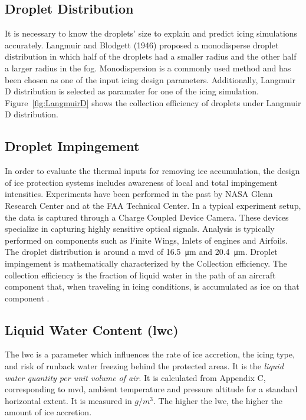 \documentclass[english]{kththesis}
\begin{document}
\subsection{Droplet Distribution}
\label{subsec:medvoldia}
It is necessary to know the droplets' size to explain and predict icing simulations accurately. Langmuir and Blodgett (1946) proposed a monodisperse droplet distribution in which half of the droplets had a smaller radius and the other half a larger radius in the fog. Monodispersion is a commonly used method and has been chosen as one of the input icing design parameters. Additionally,  Langmuir D distribution is selected as paramater for one of the icing simulation. Figure~\ref{fig:LangmuirD} shows the collection efficiency of droplets under Langmuir D distribution. 

\subsection{Droplet Impingement}
In order to evaluate the thermal inputs for removing ice accumulation, the design of ice protection systems includes awareness of local and total impingement intensities. Experiments have been performed in the past by NASA Glenn Research Center and at the FAA Technical Center. In a typical experiment setup, the data is captured through a Charge Coupled Device Camera. These devices specialize in capturing highly sensitive optical signals. Analysis is typically performed on components such as Finite Wings, Inlets of engines and Airfoils. The droplet distribution is around a \acrshort{mvd} of \SI{16,5}{\micro\metre} and \SI{20,4}{\micro\metre}. Droplet impingement is mathematically characterized by the Collection efficiency. The collection efficiency is the fraction of liquid water in the path of an aircraft component that, when traveling in icing conditions, is accumulated as ice on that component \cite{skybrary}. 


\subsection{Liquid Water Content (\acrshort{lwc})}
\label{subsec:liqwatcon}The \acrshort{lwc} is a parameter which influences the rate of ice accretion, the icing type, and risk of runback water freezing behind the protected areas\cite{dtic}. It is the \textit{liquid water quantity per unit volume of air}. It is calculated from Appendix C, corresponding to \acrshort{mvd}, ambient temperature and pressure altitude for a standard horizontal extent. It is measured in $g/m^3$. The higher the \acrshort{lwc}, the higher the amount of ice accretion.
\end{document}
